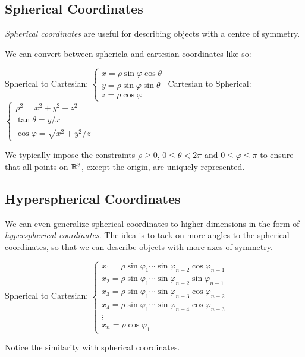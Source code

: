 \documentclass{article}
\begin{document}
\subsection{Spherical Coordinates}

\emph{Spherical coordinates} are useful for describing objects with a centre of symmetry.

\begin{definition}
  We can convert between sphericla and cartesian coordinates like so:

  Spherical to Cartesian: $
    \begin{cases}
      x  = \rho\sin\varphi\cos\theta
      \\
      y  = \rho\sin\varphi\sin\theta
      \\
      z = \rho\cos\varphi
    \end{cases}
  $
  Cartesian to Spherical: $
    \begin{cases}
      \rho^2 = x^2 + y^2 + z^2
      \\
      \tan{\theta}  = y / x
      \\
      \cos{\varphi} = \sqrt{x^2 + y^2} / z
    \end{cases}
  $
\end{definition}
We typically impose the constraints $\rho \geq 0$, $0 \leq \theta < 2\pi$ and $0 \leq \varphi \leq \pi$ to ensure that all points on $\mathbb{R}^3$, except the origin, are uniquely represented.

\subsection{Hyperspherical Coordinates}

We can even generalize spherical coordinates to higher dimensions in the form of \emph{hyperspherical coordinates}.
The idea is to tack on more angles to the spherical coordinates, so that we can describe objects with more axes of symmetry.

\begin{definition}
  Spherical to Cartesian: $
    \begin{cases}
      x_1 = \rho \sin \varphi_1 \cdots \sin \varphi_{n-2} \cos \varphi_{n-1}
      \\
      x_2 = \rho \sin \varphi_1 \cdots \sin \varphi_{n-2} \sin \varphi_{n-1}
      \\
      x_3 = \rho \sin \varphi_1 \cdots \sin \varphi_{n-3} \cos \varphi_{n-2}
      \\
      x_4 = \rho \sin \varphi_1 \cdots \sin \varphi_{n-4} \cos \varphi_{n-3}
      \\
      \vdots
      \\
      x_n = \rho \cos \varphi_1
    \end{cases}
  $
\end{definition}
Notice the similarity with spherical coordinates.
\end{document}
